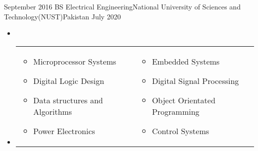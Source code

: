 {\begin{educations}
  \education
    {September 2016} {BS Electrical Engineering}{National University of Sciences and Technology(NUST)}{Pakistan} 
    {July 2020}    {
    \begin{itemize}
        \item[]
        \item[]
        \begin{tabular}{m{8cm} m{8cm}}
            \begin{itemize}
                \item Microprocessor Systems
                \item Digital Logic Design 
                \item Data structures and Algorithms
                \item Power Electronics 
            \end{itemize} 
            &
            \begin{itemize}
                \item Embedded Systems 
                \item Digital Signal Processing
                \item Object Orientated Programming
                \item Control Systems 
            \end{itemize} 
        \end{tabular}
    \end{itemize}
                    }
  \emptySeparator
\end{educations}
}